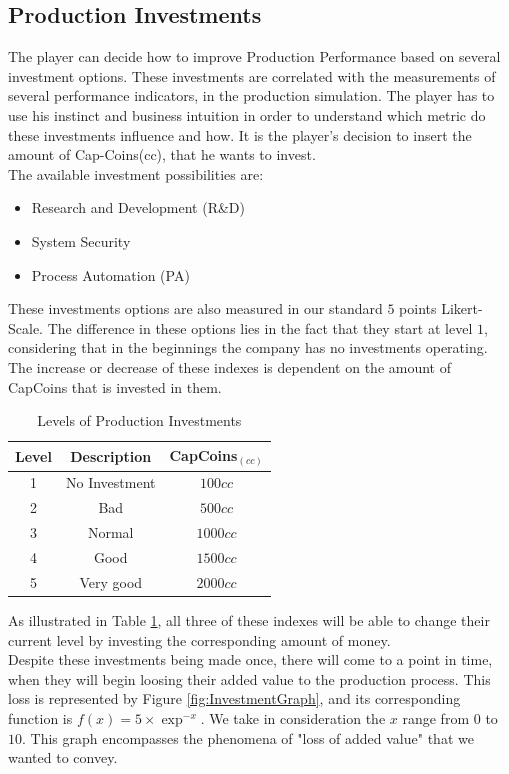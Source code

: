 \subsection{Production Investments}
The player can decide how to improve Production Performance based on several investment options. These investments are correlated with the measurements of several performance indicators, in the production simulation. The player has to use his instinct and business intuition in order to understand which metric do these investments influence and how. It is the player's decision to insert the amount of Cap-Coins(cc), that he wants to invest. \\
The available investment possibilities are:
\begin{itemize}
\item Research and Development (R\&D)
\item System Security
\item Process Automation (PA)
\end{itemize}
These investments options are also measured in our standard $5$ points Likert-Scale. The difference in these options lies in the fact that they start at level $1$, considering that in the beginnings the company has no investments operating. The increase or decrease of these indexes is dependent on the amount of CapCoins that is invested in them.

\begin{table}[ht]
\centering
\begin{tabular}{c|c|c}
\hline
 Level & Description & CapCoins$_{(cc)}$\\
\hline \hline
 1 & No Investment & $100cc$ \\
 2 & Bad & $ 500cc$\\
 3 & Normal & $1000cc$ \\
 4 & Good & $1500cc$ \\
 5 & Very good & $2000cc$\\
\hline
\end{tabular}
\caption{Levels of Production Investments}
\label{table:prod-investments}
\end{table}
As illustrated in Table \ref{table:prod-investments}, all three of these indexes will be able to change their current level by investing the corresponding amount of money.\\
Despite these investments being made once, there will come to a point in time, when they will begin loosing their added value to the production process. This loss is represented by Figure \ref{fig:InvestmentGraph}, and its corresponding function is $f(x)=5\times\exp^{-x}$. We take in consideration the $x$ range from $0$ to $10$. This graph encompasses the phenomena of "loss of added value" that we wanted to convey.

